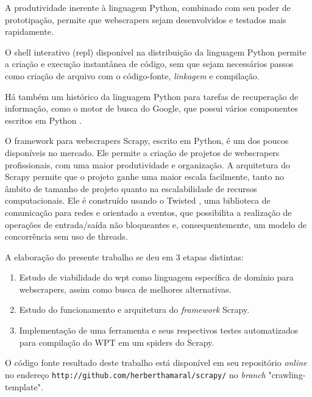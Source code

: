 A produtividade inerente à linguagem Python, combinado com seu poder de prototipação, permite que \glspl{webscraper}  sejam desenvolvidos e testados mais rapidamente.

O shell interativo (\gls{repl}) disponível na distribuição da linguagem Python permite a criação e execução instantânea de código, sem que sejam necessários passos como criação de arquivo com o código-fonte, \emph{linkagem} e compilação.

Há também um histórico da linguagem Python para tarefas de recuperação de informação, como o motor de busca do Google, que possui vários componentes escritos em Python \cite{google}.

O framework para \glspl{webscraper} Scrapy, escrito em Python, é um dos poucos disponíveis no mercado. Ele permite a criação de projetos de \glspl{webscraper} profissionais, com uma maior produtividade e organização. A arquitetura do Scrapy permite que o projeto ganhe uma maior escala facilmente, tanto no âmbito de tamanho de projeto quanto na escalabilidade de recursos computacionais. Ele é construído usando o Twisted \cite{twisted}, uma biblioteca de comunicação para redes e orientado a eventos, que possibilita a realização de operações de entrada/saída não bloqueantes e, consequentemente, um modelo de concorrência sem uso de threads. 

A elaboração do presente trabalho se deu em 3 etapas distintas:

\begin{enumerate}
	\item Estudo de viabilidade do \gls{wpt} como linguagem específica de domínio para \glspl{webscraper}, assim como busca de melhores alternativas.
	\item Estudo do funcionamento e arquitetura do \emph{framework} Scrapy.
	\item Implementação de uma ferramenta e seus respectivos testes automatizados para compilação do WPT em um \glspl{spider} do Scrapy.
\end{enumerate}

O código fonte resultado deste trabalho está disponível em seu repositório \emph{online} no endereço \texttt{http://github.com/herberthamaral/scrapy/} no \emph{branch} "crawling-template".